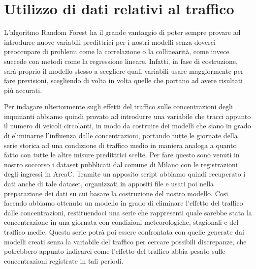 \section{Utilizzo di dati relativi al traffico}
L'algoritmo Random Forest ha il grande vantaggio di poter sempre provare ad introdurre nuove variabili predittrici per i nostri modelli senza doverci preoccupare di problemi come la correlazione o la collinearità, come invece succede con metodi come la regressione lineare. Infatti, in fase di costruzione, sarà proprio il modello stesso a scegliere quali variabili usare maggiormente per fare previsioni, scegliendo di volta in volta quelle che portano ad avere risultati più accurati.

Per indagare ulteriormente sugli effetti del traffico sulle concentrazioni degli inquinanti abbiamo quindi provato ad introdurre una variabile che tracci appunto il numero di veicoli circolanti, in modo da costruire dei modelli che siano in grado di eliminarne l'influenza dalle concentrazioni, portando tutte le giornate della serie storica ad una condizione di traffico medio in maniera analoga a quanto fatto con tutte le altre misure predittrici scelte.
Per fare questo sono venuti in nostro soccorso i dataset \cite{areac2012, areac2013, areac2014, areac2015, areac2016, areac2017, areac2018, areac20192020}
 pubblicati dal comune di Milano con le registrazioni degli ingressi in AreaC. Tramite un apposito script
 abbiamo quindi recuperato i dati anche di tale dataset, organizzati in appositi file e usati poi nella preparazione dei dati su cui basare la costruzione del nostro modello. Cosi facendo abbiamo ottenuto un modello in grado di eliminare l'effetto del traffico dalle concentrazioni, restituendoci una serie che rappresenti quale sarebbe stata la concentrazione in una giornata con condizioni meteorologiche, stagionali e del traffico medie. Questa serie potrà poi essere confrontata con quelle generate dai modelli creati senza la variabile del traffico per cercare possibili discrepanze, che potrebbero appunto indicarci come l'effetto del traffico abbia pesato sulle concentrazioni registrate in tali periodi.

